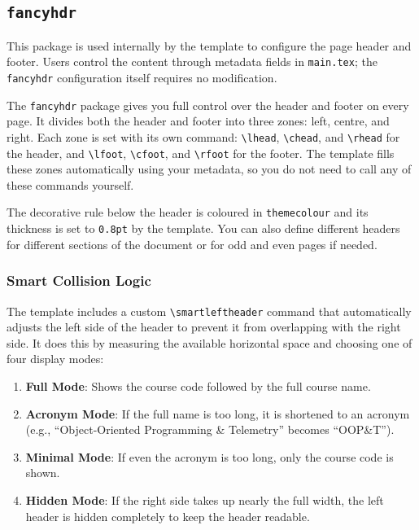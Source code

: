 	\subsection{\texttt{fancyhdr}}
	\noindent\colorbox{themecolour!15}{\parbox{\linewidth}{\small This package is used internally by the template to configure the page header and footer. Users control the content through metadata fields in \texttt{main.tex}; the \texttt{fancyhdr} configuration itself requires no modification.}}\vspace{0.5\baselineskip}
	
	The \texttt{fancyhdr} package gives you full control over the header and footer on every page. It divides both the header and footer into three zones: left, centre, and right. Each zone is set with its own command: \texttt{\textbackslash lhead}, \texttt{\textbackslash chead}, and \texttt{\textbackslash rhead} for the header, and \texttt{\textbackslash lfoot}, \texttt{\textbackslash cfoot}, and \texttt{\textbackslash rfoot} for the footer. The template fills these zones automatically using your metadata, so you do not need to call any of these commands yourself.
	
	The decorative rule below the header is coloured in \texttt{themecolour} and its thickness is set to \texttt{0.8pt} by the template. You can also define different headers for different sections of the document or for odd and even pages if needed.
	
		\subsubsection{Smart Collision Logic}
		The template includes a custom \texttt{\textbackslash smartleftheader} command that automatically adjusts the left side of the header to prevent it from overlapping with the right side. It does this by measuring the available horizontal space and choosing one of four display modes:
		
		\begin{enumerate}[noitemsep]
			\item \textbf{Full Mode}: Shows the course code followed by the full course name.
			\item \textbf{Acronym Mode}: If the full name is too long, it is shortened to an acronym (e.g., ``Object-Oriented Programming \& Telemetry'' becomes ``OOP\&T'').
			\item \textbf{Minimal Mode}: If even the acronym is too long, only the course code is shown.
			\item \textbf{Hidden Mode}: If the right side takes up nearly the full width, the left header is hidden completely to keep the header readable.
		\end{enumerate}
		
